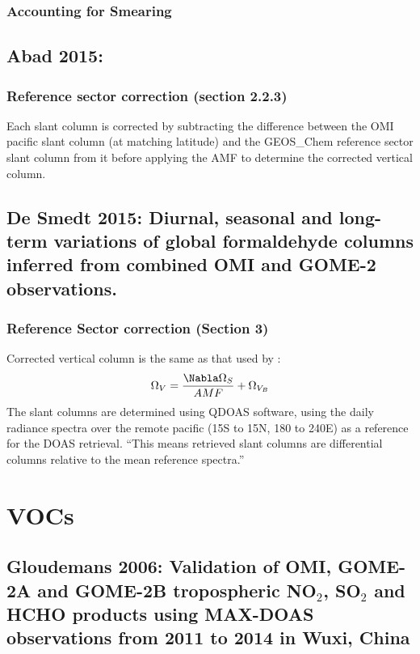 \documentclass[11pt]{article} %
\begin{document}
    \subsubsection{Accounting for Smearing}
      
  \subsection{Abad 2015: }
    \citet{Abad2015}
    \subsubsection{Reference sector correction (section 2.2.3)}
      Each slant column is corrected by subtracting the difference between the OMI pacific slant column (at matching latitude) and the GEOS_Chem reference sector slant column from it before applying the AMF to determine the corrected vertical column.
      
  
  \subsection{De Smedt 2015: Diurnal, seasonal and long-term variations of global formaldehyde columns inferred from combined OMI and GOME-2 observations.}
    \citet{DeSmedt2015}
    \subsubsection{Reference Sector correction (Section 3)}
      Corrected vertical column is the same as that used by \citet{Barkley2013}:
      \begin{equation*}
        \Omega_V = \frac{ \Nabla \Omega_{S} }{ AMF } + \Omega_{V_B}
      \end{equation*}
      The slant columns are determined using QDOAS software, using the daily radiance spectra over the remote pacific (15S to 15N, 180 to 240E) as a reference for the DOAS retrieval. 
      ``This means retrieved slant columns are differential columns relative to the mean reference spectra.''
      
      
\section{VOCs}
    
  \subsection{Gloudemans 2006: Validation of OMI, GOME-2A and GOME-2B tropospheric NO$_2$, SO$_2$ and HCHO products using MAX-DOAS observations from 2011 to 2014 in Wuxi, China}
    \citet{Gloudemans2006}
    
\end{document}
